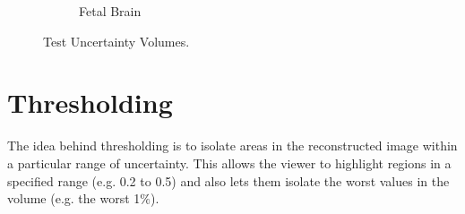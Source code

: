 \begin{figure}[h]
\begin{subfigure}[b]{0.18\textwidth}
    \caption{Fetal Brain}
    \label{fig:test_example}
  \end{subfigure}
  \caption{Test Uncertainty Volumes.}\label{fig:test_uncertainties}
\end{figure}

\newpage
\section{Thresholding}\label{section:thresholding}

The idea behind thresholding is to isolate areas in the reconstructed image within a particular range of uncertainty. This allows the viewer to highlight regions in a specified range (e.g. 0.2 to 0.5) and also lets them isolate the worst values in the volume (e.g. the worst 1$\%$).

